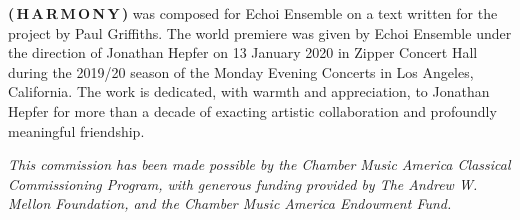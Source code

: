 \textbf{(\,H\,A\,R\,M\,O\,N\,Y\,)} was composed for Echoi Ensemble on a text
written for the project by Paul Griffiths. The world premiere was given by
Echoi Ensemble under the direction of Jonathan Hepfer on 13 January 2020 in
Zipper Concert Hall during the 2019/20 season of the Monday Evening Concerts in
Los Angeles, California. The work is dedicated, with warmth and appreciation,
to Jonathan Hepfer for more than a decade of exacting artistic collaboration
and profoundly meaningful friendship.

\textit{This commission has been made possible by the Chamber Music America
Classical Commissioning Program, with generous funding provided by The Andrew
W. Mellon Foundation, and the Chamber Music America Endowment Fund.}
